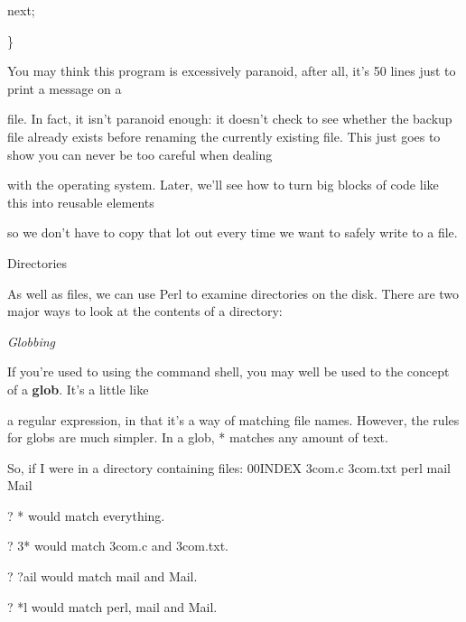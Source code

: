 \documentclass[a4paper,11pt]{book}
\begin{document}
\noindent next;

\noindent \}

\noindent 

\noindent You may think this program is excessively paranoid, after all, it's 50 lines just to print a message on a

\noindent file. In fact, it isn't paranoid enough: it doesn't check to see whether the backup file already exists before renaming the currently existing file. This just goes to show you can never be too careful when dealing

\noindent with the operating system. Later, we'll see how to turn big blocks of code like this into reusable elements

\noindent so we don't have to copy that lot out every time we want to safely write to a file.

\noindent 

\noindent 

\noindent Directories

\noindent 

\noindent As well as files, we can use Perl to examine directories on the disk. There are two major ways to look at the contents of a directory:

\noindent 

\noindent \textit{Globbing}

\noindent If you're used to using the command shell, you may well be used to the concept of a \textbf{glob}. It's a little like

\noindent a regular expression, in that it's a way of matching file names. However, the rules for globs are much simpler. In a glob, * matches any amount of text.

\noindent 

\noindent So, if I were in a directory containing files: 00INDEX 3com.c 3com.txt perl mail Mail

\noindent 

\noindent ? * would match everything.

\noindent 

\noindent ? 3* would match 3com.c and 3com.txt.

\noindent 

\noindent ? ?ail would match mail and Mail.

\noindent 

\noindent ? *l would match perl, mail and Mail.

\noindent 

\noindent 
\end{document}
